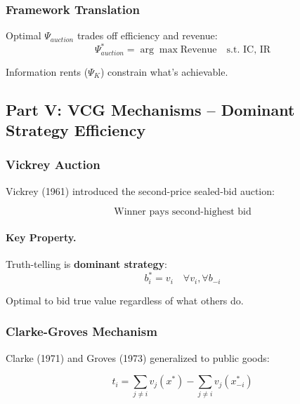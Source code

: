 \subsubsection{Framework Translation}

Optimal $\Psi_{auction}$ trades off efficiency and revenue:
\begin{equation}
\Psi^*_{auction} = \arg\max \text{Revenue} \quad \text{s.t. IC, IR}
\end{equation}

Information rents ($\Psi_K$) constrain what's achievable.

\subsection{Part V: VCG Mechanisms – Dominant Strategy Efficiency}

\subsubsection{Vickrey Auction}

Vickrey (1961) introduced the second-price sealed-bid auction:

\begin{equation}
\boxed{
\text{Winner pays second-highest bid}
}
\label{eq:vickrey}
\end{equation}

\paragraph{Key Property.}
Truth-telling is \textbf{dominant strategy}:
\begin{equation}
b_i^* = v_i \quad \forall v_i, \forall b_{-i}
\end{equation}

Optimal to bid true value regardless of what others do.

\subsubsection{Clarke-Groves Mechanism}

Clarke (1971) and Groves (1973) generalized to public goods:

\begin{equation}
\boxed{
t_i = \sum_{j \neq i} v_j(x^*) - \sum_{j \neq i} v_j(x^*_{-i})
}
\label{eq:vcg}
\end{equation}

